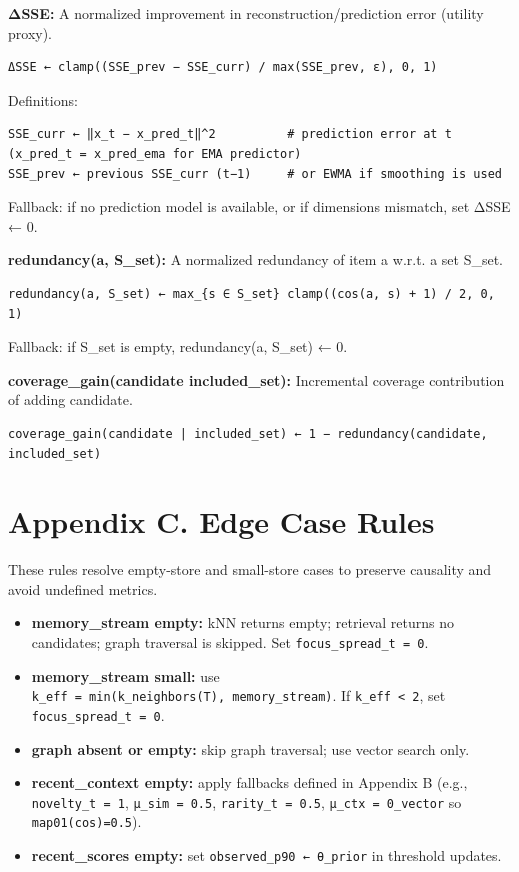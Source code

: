 \documentclass[
  letterpaper,
  DIV=11,
  numbers=noendperiod]{scrartcl}
\providecommand{\tightlist}{%
  \setlength{\itemsep}{0pt}\setlength{\parskip}{0pt}}
\begin{document}
\textbf{ΔSSE:} A normalized improvement in reconstruction/prediction
error (utility proxy).

\begin{verbatim}
ΔSSE ← clamp((SSE_prev − SSE_curr) / max(SSE_prev, ε), 0, 1)
\end{verbatim}

Definitions:

\begin{verbatim}
SSE_curr ← ‖x_t − x_pred_t‖^2          # prediction error at t (x_pred_t = x_pred_ema for EMA predictor)
SSE_prev ← previous SSE_curr (t−1)     # or EWMA if smoothing is used
\end{verbatim}

Fallback: if no prediction model is available, or if dimensions
mismatch, set ΔSSE ← 0.

\textbf{redundancy(a, S\_set):} A normalized redundancy of item a w.r.t.
a set S\_set.

\begin{verbatim}
redundancy(a, S_set) ← max_{s ∈ S_set} clamp((cos(a, s) + 1) / 2, 0, 1)
\end{verbatim}

Fallback: if S\_set is empty, redundancy(a, S\_set) ← 0.

\textbf{coverage\_gain(candidate \textbar{} included\_set):} Incremental
coverage contribution of adding candidate.

\begin{verbatim}
coverage_gain(candidate | included_set) ← 1 − redundancy(candidate, included_set)
\end{verbatim}

\section*{Appendix C. Edge Case Rules}\label{sec-app-edge}

These rules resolve empty-store and small-store cases to preserve
causality and avoid undefined metrics.

\begin{itemize}
\tightlist
\item
  \textbf{memory\_stream empty:} kNN returns empty; retrieval returns no
  candidates; graph traversal is skipped. Set
  \texttt{focus\_spread\_t\ =\ 0}.
\item
  \textbf{memory\_stream small:} use
  \texttt{k\_eff\ =\ min(k\_neighbors(T),\ \textbar{}memory\_stream\textbar{})}.
  If \texttt{k\_eff\ \textless{}\ 2}, set
  \texttt{focus\_spread\_t\ =\ 0}.
\item
  \textbf{graph absent or empty:} skip graph traversal; use vector
  search only.
\item
  \textbf{recent\_context empty:} apply fallbacks defined in Appendix B
  (e.g., \texttt{novelty\_t\ =\ 1}, \texttt{μ\_sim\ =\ 0.5},
  \texttt{rarity\_t\ =\ 0.5}, \texttt{μ\_ctx\ =\ 0\_vector} so
  \texttt{map01(cos)=0.5}).
\item
  \textbf{recent\_scores empty:} set \texttt{observed\_p90\ ←\ θ\_prior}
  in threshold updates.
\end{itemize}
\end{document}
